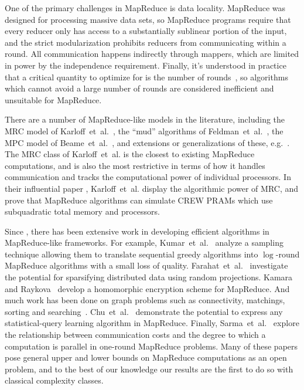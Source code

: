 \documentclass[letterpaper,USenglish]{lipics}
\theoremstyle{definition}
\theoremstyle{remark}
\begin{document}
One of the primary challenges in MapReduce is data locality. MapReduce was
designed for processing massive data sets, so MapReduce programs require that
every reducer only has access to a substantially sublinear portion of the
input, and the strict modularization prohibits reducers from communicating
within a round. All communication happens indirectly through mappers, which are
limited in power by the independence requirement. Finally, it's understood in
practice that a critical quantity to optimize for is the number of
rounds~\cite{Karloff10}, so algorithms which cannot avoid a large number of
rounds are considered inefficient and unsuitable for MapReduce.

There are a number of MapReduce-like models in the literature, including the
MRC model of Karloff~et~al.~\cite{Karloff10}, the ``mud'' algorithms of
Feldman~et~al.~\cite{FeldmanMSSS10}, the MPC model of
Beame~et~al.~\cite{BeameKS13}, and extensions or generalizations of these,
e.g.~\cite{GoodrichSZ11}. The MRC class of Karloff~et~al. is the closest to
existing MapReduce computations, and is also the most restrictive in terms of
how it handles communication and tracks the computational power of individual
processors. In their influential paper \cite{Karloff10}, Karloff~et~al. display
the algorithmic power of MRC, and prove that MapReduce algorithms can simulate
CREW PRAMs which use subquadratic total memory and processors.

Since \cite{Karloff10}, there has been extensive work in developing efficient
algorithms in MapReduce-like frameworks. For example,
Kumar~et~al.~\cite{KMVV13} analyze a sampling technique allowing them to
translate sequential greedy algorithms into $\log$-round MapReduce algorithms
with a small loss of quality.  Farahat~et~al.~\cite{FEGK13} investigate the
potential for sparsifying distributed data using random projections. Kamara and
Raykova~\cite{KR13} develop a homomorphic encryption scheme for MapReduce. And
much work has been done on graph problems such as connectivity, matchings,
sorting and searching~\cite{GoodrichSZ11}. Chu~et~al.~\cite{ChuKLYBNO06}
demonstrate the potential to express any statistical-query learning algorithm
in MapReduce.  Finally, Sarma~et~al.~\cite{Sarma13} explore the relationship
between communication costs and the degree to which a computation is parallel
in one-round MapReduce problems. Many of these papers pose general upper and
lower bounds on MapReduce computations as an open problem, and to the best of
our knowledge our results are the first to do so with classical complexity
classes.
\end{document}
